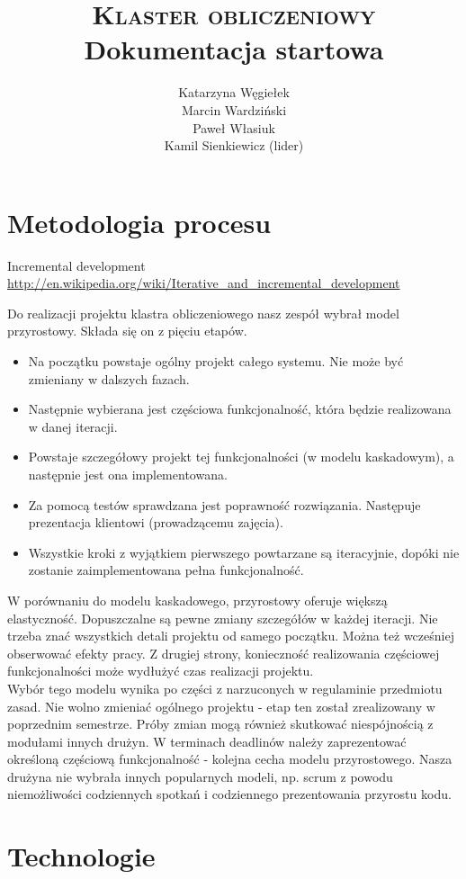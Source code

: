 \documentclass[a4paper]{article}
\title{\textsc{Klaster obliczeniowy}\\Dokumentacja startowa}
\author{Katarzyna Węgiełek\\Marcin Wardziński\\Paweł Własiuk\\Kamil Sienkiewicz (lider)}
\begin{document}
	\maketitle
	
	\section{Metodologia procesu}
	Incremental development \url{http://en.wikipedia.org/wiki/Iterative_and_incremental_development}
	
	Do realizacji projektu klastra obliczeniowego nasz zespół wybrał model przyrostowy. Składa się on z pięciu etapów.
	\begin{itemize}
		\item Na początku powstaje ogólny projekt całego systemu. Nie może być zmieniany w dalszych fazach.
		\item Następnie wybierana jest częściowa funkcjonalność, która będzie realizowana w danej iteracji.
		\item Powstaje szczegółowy projekt tej funkcjonalności (w modelu kaskadowym), a następnie jest ona implementowana.
		\item Za pomocą testów sprawdzana jest poprawność rozwiązania. Następuje prezentacja klientowi (prowadzącemu zajęcia).
		\item Wszystkie kroki z wyjątkiem pierwszego powtarzane są iteracyjnie, dopóki nie zostanie zaimplementowana pełna funkcjonalność.
	\end{itemize}
	
	
	W porównaniu do modelu kaskadowego, przyrostowy oferuje większą elastyczność. Dopuszczalne są pewne zmiany szczegółów w każdej iteracji. Nie trzeba znać wszystkich detali projektu od samego początku. Można też wcześniej obserwować efekty pracy. Z drugiej strony, konieczność realizowania częściowej funkcjonalności może wydłużyć czas realizacji projektu.\\
	
	
	
	Wybór tego modelu wynika po części z narzuconych w regulaminie przedmiotu zasad. Nie wolno zmieniać ogólnego projektu - etap ten został zrealizowany w poprzednim semestrze. Próby zmian mogą również skutkować niespójnością z modułami innych drużyn. W terminach deadlinów należy zaprezentować określoną częściową funkcjonalność - kolejna cecha modelu przyrostowego. Nasza drużyna nie wybrała innych popularnych modeli, np. scrum z powodu niemożliwości codziennych spotkań i codziennego prezentowania przyrostu kodu. 
	\section{Technologie}
	
\end{document}
